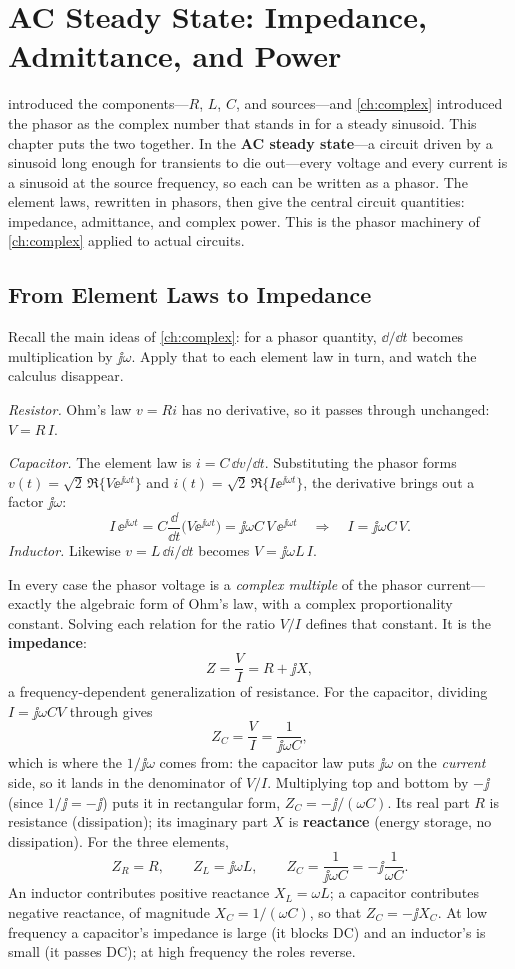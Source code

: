 \chapter{AC Steady State: Impedance, Admittance, and Power}
\label{ch:ac}
 introduced the components---\(R\), \(L\), \(C\), and
sources---and \cref{ch:complex} introduced the phasor as the complex number that
stands in for a steady sinusoid. This chapter puts the two together. In the
\textbf{AC steady state}---a circuit driven by a sinusoid long enough for
transients to die out---every voltage and every current is a sinusoid at the
source frequency, so each can be written as a phasor. The element laws, rewritten
in phasors, then give the central circuit quantities: impedance, admittance, and
complex power. This is the phasor machinery of \cref{ch:complex} applied to actual
circuits.

\section{From Element Laws to Impedance}
Recall the main ideas of \cref{ch:complex}: for a phasor quantity, \(\dd/\dd t\)
becomes multiplication by \(\jj\omega\). Apply that to each element law in turn,
and watch the calculus disappear.

\emph{Resistor.} Ohm's law \(v=Ri\) has no derivative, so it passes through
unchanged: \(V=R\,I\).

\emph{Capacitor.} The element law is \(i=C\,\dd v/\dd t\). Substituting the phasor
forms \(v(t)=\sqrt2\,\Re\{V\ee^{\jj\omega t}\}\) and
\(i(t)=\sqrt2\,\Re\{I\ee^{\jj\omega t}\}\), the derivative brings out a factor
\(\jj\omega\):
\[
I\,\ee^{\jj\omega t}=C\frac{\dd}{\dd t}\bigl(V\ee^{\jj\omega t}\bigr)
=\jj\omega C\,V\,\ee^{\jj\omega t}
\quad\Longrightarrow\quad
I=\jj\omega C\,V .
\]
\emph{Inductor.} Likewise \(v=L\,\dd i/\dd t\) becomes \(V=\jj\omega L\,I\).

In every case the phasor voltage is a \emph{complex multiple} of the phasor
current---exactly the algebraic form of Ohm's law, with a complex proportionality
constant. Solving each relation for the ratio \(V/I\) defines that constant. It is
the \textbf{impedance}:
\[
Z=\frac{V}{I}=R+\jj X,
\]
a frequency-dependent generalization of resistance. For the capacitor, dividing
\(I=\jj\omega C V\) through gives
\[
Z_C=\frac{V}{I}=\frac{1}{\jj\omega C},
\]
which is where the \(1/\jj\omega\) comes from: the capacitor law puts \(\jj\omega\)
on the \emph{current} side, so it lands in the denominator of \(V/I\). Multiplying
top and bottom by \(-\jj\) (since \(1/\jj=-\jj\)) puts it in rectangular form,
\(Z_C=-\jj/(\omega C)\). Its real part \(R\) is
resistance (dissipation); its imaginary part \(X\) is \textbf{reactance} (energy
storage, no dissipation). For the three elements,
\[
Z_R=R,\qquad
Z_L=\jj\omega L,\qquad
Z_C=\frac{1}{\jj\omega C}=-\jj\frac{1}{\omega C}.
\]
An inductor contributes positive reactance \(X_L=\omega L\); a capacitor
contributes negative reactance, of magnitude \(X_C=1/(\omega C)\), so that
\(Z_C=-\jj X_C\). At low frequency a capacitor's impedance is large
(it blocks DC) and an inductor's is small (it passes DC); at high frequency the
roles reverse.

